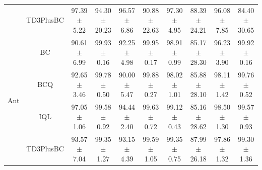 \begin{table}[!ht]
\begin{tabular}{cccccccccc}
                                                                                           & TD3PlusBC                                                                                  & 97.39$\pm$5.22  & 94.30$\pm$20.23 & 96.57$\pm$6.86  & 90.88$\pm$22.63 & 97.30$\pm$4.95 & 88.39$\pm$24.21                              & 96.08$\pm$7.85 & 84.40$\pm$30.65                                    \\ 
    \cline{2-10}
    \multirow{4}{*}{Ant}                                                                   & BC                                                                                         & 90.61$\pm$6.99  & 99.93$\pm$0.16  & 92.25$\pm$4.98  & 99.95$\pm$0.17  & 98.91$\pm$0.99 & 85.17$\pm$28.30                              & 96.23$\pm$3.90 & 99.92$\pm$0.16                                     \\
                                                                                           & BCQ                                                                                        & 92.65$\pm$3.46  & 99.78$\pm$0.50  & 90.00$\pm$5.47  & 99.88$\pm$0.27  & 98.02$\pm$1.01 & 85.88$\pm$28.10                              & 98.11$\pm$1.42 & 99.76$\pm$0.52                                     \\
                                                                                           & IQL                                                                                        & 97.05$\pm$1.06  & 99.58$\pm$0.92  & 94.44$\pm$2.40  & 99.63$\pm$0.72  & 99.12$\pm$0.43 & 85.16$\pm$28.62                              & 98.50$\pm$1.30 & 99.57$\pm$0.93                                     \\
                                                                                           & TD3PlusBC                                                                                  & 93.57$\pm$7.04  & 99.35$\pm$1.27  & 93.15$\pm$4.39  & 99.59$\pm$1.05  & 99.35$\pm$0.75 & 87.99$\pm$26.18                              & 97.86$\pm$1.32 & 99.30$\pm$1.36                                     \\
    \bottomrule
    \end{tabular}
\end{table}
    
